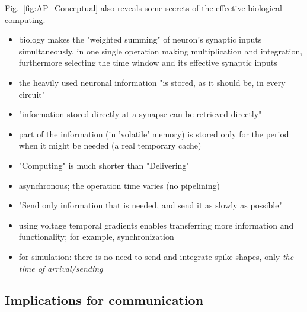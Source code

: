 Fig.~\ref{fig:AP_Conceptual} also reveals some secrets of the effective
biological computing.
\begin{itemize}
\item biology makes the "weighted summing" of neuron's synaptic inputs 
simultaneously, in one single operation making multiplication and integration, furthermore selecting the time window and its effective synaptic inputs
\item the heavily used neuronal information "is stored, as it should be, in every circuit"~\cite{SterlingPrinciples:2017}
\item "information stored
directly at a synapse can be retrieved directly"~\cite{SterlingPrinciples:2017}
\item part of the information (in 'volatile' memory) is stored only
for the period when it might be needed (a real temporary cache)
\item "Computing" is much shorter than "Delivering"
\item asynchronous; the operation time varies (no pipelining)
\item "Send only information that is needed, and send it as slowly as possible"~\cite{SterlingPrinciples:2017}
\item using voltage temporal gradients enables transferring more information and functionality;
for example, synchronization~\cite{LosonczyIntegrative:2006}
\item for simulation: there is no need to send and integrate spike shapes,
only \textit{the time of arrival/sending} 

\end{itemize} 


\subsection[Communication]{Implications for communication\label{sec:Single-ImplicationsCommunication}}
